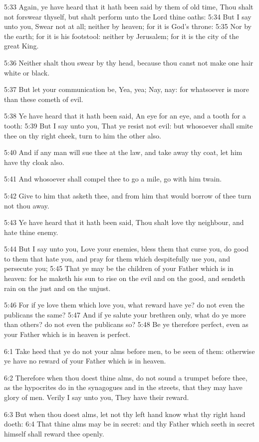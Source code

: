 5:33 Again, ye have heard that it hath been said by them of old time, Thou shalt not forswear thyself, but shalt perform unto the Lord thine oaths: 5:34 But I say unto you, Swear not at all; neither by heaven; for it is God's throne: 5:35 Nor by the earth; for it is his footstool: neither by Jerusalem; for it is the city of the great King.

5:36 Neither shalt thou swear by thy head, because thou canst not make one hair white or black.

5:37 But let your communication be, Yea, yea; Nay, nay: for whatsoever is more than these cometh of evil.

5:38 Ye have heard that it hath been said, An eye for an eye, and a tooth for a tooth: 5:39 But I say unto you, That ye resist not evil: but whosoever shall smite thee on thy right cheek, turn to him the other also.

5:40 And if any man will sue thee at the law, and take away thy coat, let him have thy cloak also.

5:41 And whosoever shall compel thee to go a mile, go with him twain.

5:42 Give to him that asketh thee, and from him that would borrow of thee turn not thou away.

5:43 Ye have heard that it hath been said, Thou shalt love thy neighbour, and hate thine enemy.

5:44 But I say unto you, Love your enemies, bless them that curse you, do good to them that hate you, and pray for them which despitefully use you, and persecute you; 5:45 That ye may be the children of your Father which is in heaven: for he maketh his sun to rise on the evil and on the good, and sendeth rain on the just and on the unjust.

5:46 For if ye love them which love you, what reward have ye? do not even the publicans the same?  5:47 And if ye salute your brethren only, what do ye more than others? do not even the publicans so?  5:48 Be ye therefore perfect, even as your Father which is in heaven is perfect.

6:1 Take heed that ye do not your alms before men, to be seen of them: otherwise ye have no reward of your Father which is in heaven.

6:2 Therefore when thou doest thine alms, do not sound a trumpet before thee, as the hypocrites do in the synagogues and in the streets, that they may have glory of men. Verily I say unto you, They have their reward.

6:3 But when thou doest alms, let not thy left hand know what thy right hand doeth: 6:4 That thine alms may be in secret: and thy Father which seeth in secret himself shall reward thee openly.

